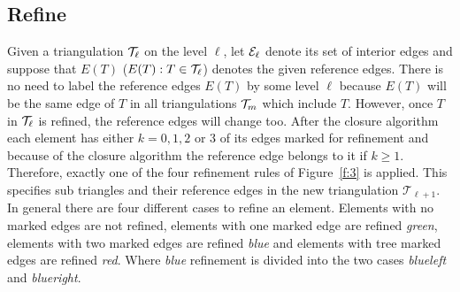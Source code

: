 \subsection{Refine}
%
Given a triangulation $\mathcal{T}_\ell$ on the level $\ell$, let $\mathcal{E}_\ell$ denote its set of interior edges and suppose that $E(T)$ ($E(T):T\in\mathcal{T}_\ell$) denotes the given reference edges. There is no need to label the reference edges $E(T)$ by some level $\ell$ because $E(T)$ will be the same edge of $T$ in all triangulations $\mathcal{T}_m$ which include $T$. However, once $T$ in $\mathcal{T}_\ell$ is refined, the reference edges will change too.
After the closure algorithm each element has either $k = 0,1,2$ or 3 of 
its edges marked for refinement and because of the closure 
algorithm the reference edge belongs to it if $k\geq 1$. 
Therefore, exactly one of the four refinement rules of Figure~\ref{f:3} is applied.
This specifies sub triangles and their reference edges in the new triangulation $\mathcal{T}_{\ell+1}$.
In general there are four different cases to refine an element. 
Elements with no marked edges are not refined, elements with one marked edge
are refined \emph{green}, elements with 
two marked edges are refined \emph{blue} and elements with tree 
marked edges are refined \emph{red}. Where \emph{blue} refinement
is divided into the two cases \emph{blueleft} and \emph{blueright}.\bigskip


